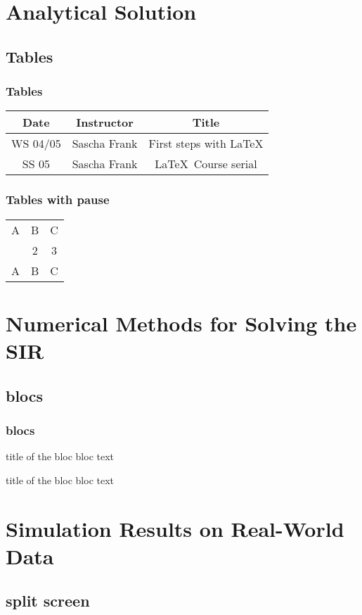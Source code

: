 \documentclass{beamer}
\begin{document}
\section{Analytical Solution}
\subsection{Tables}
\begin{frame}\frametitle{Tables}
\begin{tabular}{|c|c|c|}
\hline
\textbf{Date} & \textbf{Instructor} & \textbf{Title} \\
\hline
WS 04/05 & Sascha Frank & First steps with  \LaTeX  \\
\hline
SS 05 & Sascha Frank & \LaTeX \ Course serial \\
\hline
\end{tabular}
\end{frame}


\begin{frame}\frametitle{Tables with pause}
\begin{tabular}{c c c}
A & B & C \\
\pause
1 & 2 & 3 \\
\pause
A & B & C \\
\end{tabular}
\end{frame}


\section{Numerical Methods for Solving the SIR}
\subsection{blocs}
\begin{frame}\frametitle{blocs}


\begin{exampleblock}{title of the bloc}
bloc text
\end{exampleblock}


\begin{alertblock}{title of the bloc}
bloc text
\end{alertblock}
\end{frame}


\section{Simulation Results on Real-World Data}
\subsection{split screen}
\end{document}
